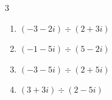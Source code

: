 \begin{multicols}{3}
\begin{enumerate}
  \item $\displaystyle (-3-2i)\div(2+3i)$


  \item $\displaystyle (-1-5i)\div(5-2i)$


  \item $\displaystyle (-3-5i)\div(2+5i)$


  \item $\displaystyle (3+3i)\div(2-5i)$


\end{enumerate}
\end{multicols}

\newpage
\resetdrill

